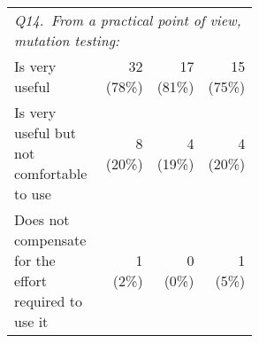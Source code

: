 {\begin{longtable}{m{0.55\linewidth}rrr}
    \multicolumn{4}{m{0.9\linewidth}}{\textit{Q14.~From a practical point of view, mutation testing:}} \\*    Is very useful & 32 (78\%) & 17 (81\%) & 15 (75\%) \\*
    Is very useful but not comfortable to use & 8 (20\%) & 4 (19\%) & 4 (20\%) \\*
    Does not compensate for the effort required to use it & 1 (2\%) & 0 (0\%) & 1 (5\%) \\ \hline

\end{longtable}}
